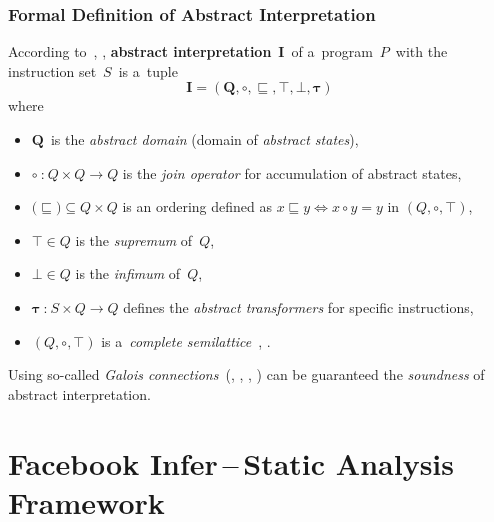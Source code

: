 \subsubsection*{Formal Definition of Abstract Interpretation}

\begin{definition}
    According to~\cite{AILatticeModelCousot}, \cite{favAI},
    \textbf{abstract interpretation}~$ \boldsymbol{I} $~of a~program~$ P $~with
    the instruction set~$ S $~is a~tuple
    $$ \boldsymbol{I = (Q, \circ, \sqsubseteq, \top, \bot, \tau)} $$
    where
    \begin{itemize}
        \item
            $ \boldsymbol{Q} $~is the \emph{abstract domain} (domain of
            \emph{abstract states}),

        \item
            $ \boldsymbol{\circ}~\text{:}~Q \times Q \rightarrow Q $
            is the \emph{join operator} for accumulation of abstract states,

        \item
            $ \text{(}\boldsymbol{\sqsubseteq}\text{)} \subseteq Q \times Q $ is
            an ordering defined as
            $ x \sqsubseteq y \Leftrightarrow x \circ y = y $ in
            $ (Q, \circ, \top) $,

        \item
            $ \boldsymbol{\top} \in Q $ is the \emph{supremum} of~$ Q $,

        \item
            $ \boldsymbol{\bot} \in Q $ is the \emph{infimum} of~$ Q $,

        \item
            $ \boldsymbol{\tau}~\text{:}~S \times Q \rightarrow Q $
            defines the \emph{abstract transformers} for specific instructions,

        \item
            $ (Q, \circ, \top) $ is a~\emph{complete
            semilattice}~\cite{favLatticesAndFixpoints}, \cite{favAI}.
    \end{itemize}
\end{definition}

Using so-called \emph{Galois connections}~(\cite{programAnalysisNielson},
\cite{wideningNarrowingCousot}, \cite{favAI}, \cite{AICousotWeb}) can be
guaranteed the \emph{soundness} of abstract interpretation.


\section{\texorpdfstring{Facebook Infer\,--\,Static Analysis Framework}{}}
\label{sec:fbinfer}

